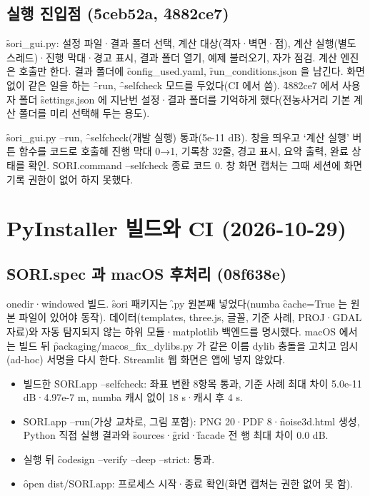 \documentclass[10.5pt,a4paper]{article}
\begin{document}
\subsection{실행 진입점 (\f{5ceb52a}, \f{4882ce7})}
 \f{sori\_gui.py}: 설정 파일·결과 폴더 선택, 계산 대상(격자·벽면·점), 계산 실행(별도 스레드)·진행 막대·경고 표시, 결과 폴더 열기, 예제 불러오기, 자가 점검. 계산 엔진은 호출만 한다. 결과 폴더에 \f{config\_used.yaml}, \f{run\_conditions.json} 을 남긴다. 화면 없이 같은 일을 하는 \f{--run}, \f{--selfcheck} 모드를 두었다(CI 에서 씀). \f{4882ce7} 에서 사용자 폴더 \f{settings.json} 에 지난번 설정·결과 폴더를 기억하게 했다(전농사거리 기본 계산 폴더를 미리 선택해 두는 용도).

 \f{sori\_gui.py --run}, \f{--selfcheck}(개발 실행) 통과(5e-11 dB). 창을 띄우고 ‘계산 실행’ 버튼 함수를 코드로 호출해 진행 막대 0→1, 기록창 32줄, 경고 표시, 요약 출력, 완료 상태를 확인. \f{SORI.command --selfcheck} 종료 코드 0. 창 화면 캡처는 그때 세션에 화면 기록 권한이 없어 하지 못했다.

\section{PyInstaller 빌드와 CI (2026-10-29)}

\subsection{\f{SORI.spec} 과 macOS 후처리 (\f{08f638e})}
 onedir·windowed 빌드. \f{sori} 패키지는 \f{.py} 원본째 넣었다(numba \f{cache=True} 는 원본 파일이 있어야 동작). 데이터(templates, three.js, 글꼴, 기준 사례, PROJ·GDAL 자료)와 자동 탐지되지 않는 하위 모듈·matplotlib 백엔드를 명시했다. macOS 에서는 빌드 뒤 \f{packaging/macos\_fix\_dylibs.py} 가 같은 이름 dylib 충돌을 고치고 임시(ad-hoc) 서명을 다시 한다. Streamlit 웹 화면은 앱에 넣지 않았다.

\begin{itemize}
\item 빌드한 \f{SORI.app --selfcheck}: 좌표 변환 8항목 통과, 기준 사례 최대 차이 5.0e-11 dB·4.97e-7 m, numba 캐시 없이 18 s·캐시 후 4 s.
\item \f{SORI.app --run}(가상 교차로, 그림 포함): PNG 20·PDF 8·\f{noise3d.html} 생성, Python 직접 실행 결과와 \f{sources}·\f{grid}·\f{facade} 전 행 최대 차이 0.0 dB.
\item 실행 뒤 \f{codesign --verify --deep --strict}: 통과.
\item \f{open dist/SORI.app}: 프로세스 시작·종료 확인(화면 캡처는 권한 없어 못 함).
\end{itemize}
\end{document}

